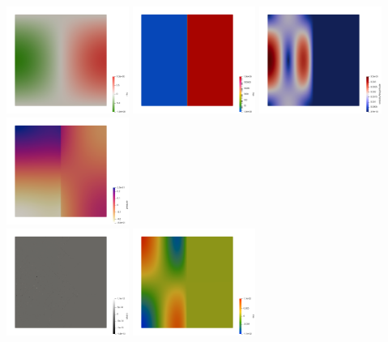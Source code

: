 \begin{center}
\includegraphics[width=4cm]{python_codes/fieldstone_158/results/exp3/rho}
\includegraphics[width=4cm]{python_codes/fieldstone_158/results/exp3/eta}
\includegraphics[width=4cm]{python_codes/fieldstone_158/results/exp3/vel}
\includegraphics[width=4cm]{python_codes/fieldstone_158/results/exp3/press}\\
\includegraphics[width=4cm]{python_codes/fieldstone_158/results/exp3/divv}
\includegraphics[width=4cm]{python_codes/fieldstone_158/results/exp3/exx}

\end{center}
